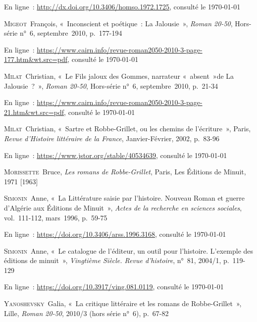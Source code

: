 \documentclass[12pt, a4paper]{article}
\begin{document}
            En ligne~: \hyperlink{http://dx.doi.org/10.3406/homso.1972.1725}{http://dx.doi.org/10.3406/homso.1972.1725}, consulté le \today
        \par
    \textsc{Migeot}~François, «~Inconscient et poétique~: La Jalousie~»,  \textit{Roman 20-50}, Hors-série n°~6, septembre~2010, p.~177-194
            
            En ligne~: \hyperlink{https://www.cairn.info/revue-roman2050-2010-3-page-177.htm\&wt.src=pdf}{https://www.cairn.info/revue-roman2050-2010-3-page-177.htm\&wt.src=pdf}, consulté le \today
        \par
    \textsc{Milat}~Christian, «~Le Fils jaloux des Gommes, narrateur «~absent~»de La Jalousie~?~»,  \textit{Roman 20-50}, Hors-série n°~6, septembre~2010, p.~21-34
            
            En ligne~: \hyperlink{https://www.cairn.info/revue-roman2050-2010-3-page-21.htm\&wt.src=pdf}{https://www.cairn.info/revue-roman2050-2010-3-page-21.htm\&wt.src=pdf}, consulté le \today
        \par
    \textsc{Milat}~Christian, «~Sartre et Robbe-Grillet, ou les chemins de l'écriture~», Paris, \textit{Revue d'Histoire littéraire de la France}, Janvier-Février, 2002, p.~83-96
            
            En ligne~: \hyperlink{https://www.jstor.org/stable/40534639}{https://www.jstor.org/stable/40534639}, consulté le \today
        \par
    \textsc{Morissette}~Bruce, \textit{Les romans de Robbe-Grillet}, Paris, Les Éditions de Minuit, 1971 [1963]\par 
    \textsc{Simonin}~Anne, «~La Littérature saisie par l'histoire. Nouveau Roman et guerre d'Algérie aux Éditions de Minuit~»,  \textit{Actes de la recherche en sciences sociales}, vol.~111-112, mars~1996, p.~59-75
            
            En ligne~: \hyperlink{https://doi.org/10.3406/arss.1996.3168}{https://doi.org/10.3406/arss.1996.3168}, consulté le \today
        \par
    \textsc{Simonin}~Anne, «~Le catalogue de l'éditeur, un outil pour l'histoire. L'exemple des éditions de minuit~»,  \textit{Vingtième Siècle. Revue d'histoire}, n°~81, 2004/1, p.~119-129
            
            En ligne~: \hyperlink{https://doi.org/10.3917/ving.081.0119}{https://doi.org/10.3917/ving.081.0119}, consulté le \today
        \par
    \textsc{Yanoshevsky}~Galia, «~La critique littéraire et les romans de Robbe-Grillet~», Lille, \textit{Roman 20-50}, 2010/3 (hors série n°~6), p.~67-82
            
\end{document}
